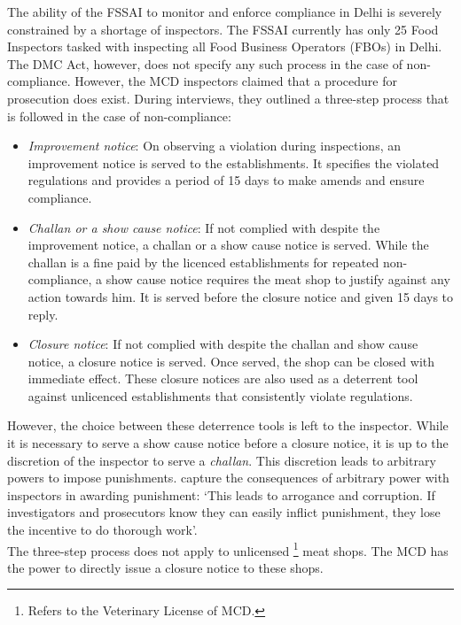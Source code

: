 \documentclass[a4paper, 12pt]{article}
\begin{document}
The ability of the FSSAI to monitor and enforce compliance in Delhi is severely constrained by a shortage of inspectors. The FSSAI currently has only 25 Food Inspectors tasked with inspecting all Food Business Operators (FBOs) in Delhi.\\

The DMC Act, however, does not specify any such process in the case of non-compliance. However, the MCD inspectors claimed that a procedure for prosecution does exist. During interviews, they outlined a three-step process that is followed in the case of non-compliance:\\
\begin{itemize}
\item \textit{Improvement notice}: On observing a violation during inspections, an improvement notice is served to the establishments. It specifies the violated regulations and provides a period of 15 days to make amends and ensure compliance.
\item \textit{Challan or a show cause notice}: If not complied with despite the improvement notice, a challan or a show cause notice is served. While the challan is a fine paid by the licenced establishments for repeated non-compliance, a show cause notice requires the meat shop to justify against any action towards him. It is served before the closure notice and given 15 days to reply. 
\item \textit{Closure notice}: If not complied with despite the challan and show cause notice, a closure notice is served. Once served, the shop can be closed with immediate effect. These closure notices are also used as a deterrent tool against unlicenced establishments that consistently violate regulations. \\
\end{itemize}

However, the choice between these deterrence tools is left to the inspector. While it is necessary to serve a show cause notice before a closure notice, it is up to the discretion of the inspector to serve a \textit{challan}. This discretion leads to arbitrary powers to impose punishments. \cite{roychapter} capture the consequences of arbitrary power with inspectors in awarding punishment: ‘This leads to arrogance and corruption. If investigators and prosecutors know they can easily inflict punishment, they lose the incentive to do thorough work’.\\

The three-step process does not apply to unlicensed \footnote{ Refers to the Veterinary License of MCD.} meat shops. The MCD has the power to directly issue a closure notice to these shops.
\end{document}
